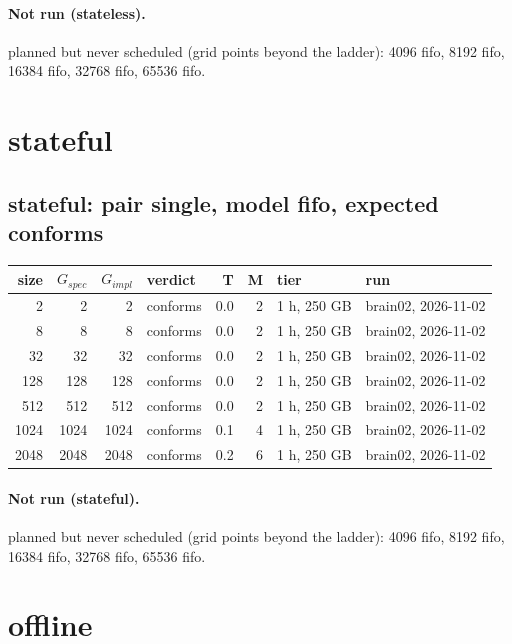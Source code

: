 \documentclass[10pt]{article}
\begin{document}
\paragraph{Not run (stateless).}
planned but never scheduled (grid points beyond the ladder): 4096 fifo, 8192 fifo, 16384 fifo, 32768 fifo, 65536 fifo.\par
\section*{stateful}
\subsection*{stateful: pair \textsf{single}, model fifo, expected conforms}
\begin{longtable}{@{}rrrlrrll@{}}
\toprule
size & $G_{\mathit{spec}}$ & $G_{\mathit{impl}}$ & verdict & T & M & tier & run \\
\midrule
\endhead
\color{blue} 2 & 2 & 2 & conforms & 0.0 & 2 & 1 h, 250 GB & brain02, 2026-11-02 \\
\color{blue} 8 & 8 & 8 & conforms & 0.0 & 2 & 1 h, 250 GB & brain02, 2026-11-02 \\
\color{blue} 32 & 32 & 32 & conforms & 0.0 & 2 & 1 h, 250 GB & brain02, 2026-11-02 \\
\color{blue} 128 & 128 & 128 & conforms & 0.0 & 2 & 1 h, 250 GB & brain02, 2026-11-02 \\
\color{blue} 512 & 512 & 512 & conforms & 0.0 & 2 & 1 h, 250 GB & brain02, 2026-11-02 \\
\color{blue} 1024 & 1024 & 1024 & conforms & 0.1 & 4 & 1 h, 250 GB & brain02, 2026-11-02 \\
\color{blue} 2048 & 2048 & 2048 & conforms & 0.2 & 6 & 1 h, 250 GB & brain02, 2026-11-02 \\
\bottomrule
\end{longtable}
\paragraph{Not run (stateful).}
planned but never scheduled (grid points beyond the ladder): 4096 fifo, 8192 fifo, 16384 fifo, 32768 fifo, 65536 fifo.\par
\section*{offline}
\end{document}
